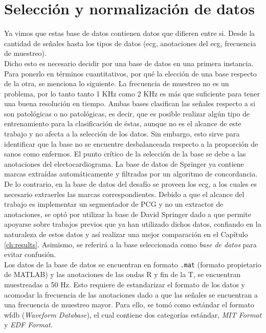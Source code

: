 \section{Selección y normalización de datos} \label{sec:data-selection-normalization}

Ya vimos que estas base de datos contienen datos que difieren entre si. Desde la cantidad de señales hasta los tipos
de datos (\acrshort{ecg}, anotaciones del \acrshort{ecg}, frecuencia de muestreo). \\
\indent Dicho esto es necesario decidir por una base de datos en una primera instancia. Para ponerlo en términos
cuantitativos, por qué la elección de una base respecto de la otra, se menciona lo siguiente. La frecuencia de
muestreo no es un problema, por lo tanto tanto 1 KHz como 2 KHz es más que suficiente para tener una buena
resolución en tiempo. Ambas bases clasifican las señales respecto a si son patológicas o no patológicas, es decir,
que es posible realizar algún tipo de entrenamiento para la clasificación de éstas, aunque no es el alcance de este
trabajo y no afecta a la selección de los datos. Sin embargo, esto sirve para identificar que la base no se
encuentre desbalanceada respecto a la proporción de sanos como enfermos. El punto crítico de la selección de la base
se debe a las anotaciones del electocardiograma. La base de datos de Springer \cite{ref:logi-regression-springer} ya
contiene marcas extraídas automáticamente y filtradas por un algoritmo de concordancia. De lo contrario, en la base
de datos del desafío se proveen los \acrshort{ecg}, a los cuales es necesario extraerles las marcas correspondientes.
Debido a que el alcance del trabajo es implementar un segmentador de PCG y no un extractor de anotaciones, se optó
por utilizar la base de David Springer dado a que permite apoyarse sobre trabajos previos que ya han utilizado
dichos datos, confiando en la naturaleza de estos datos y así realizar una mejor comparación en el Capítulo
\ref{ch:results}. Asimismo, se referirá a la base seleccionada como \textit{base de datos} para evitar confusión. \\
\indent Los datos de la base de datos se encuentran en formato \texttt{.mat} (formato propietario de
\textsc{MATLAB\texttrademark}) y las anotaciones de las ondas R y fin de la T, se encuentran muestreadas a 50 Hz.
Esto requiere de estandarizar el formato de los datos y acomodar la frecuencia de las anotaciones dado a que las
señales se encuentran a una frecuencia de muestreo mayor. Para ello, se tomó como estándar el formato
\acrshort{wfdb} (\textit{Waveform Database}), el cual contiene dos categorías estándar, \textit{MIT Format} y
\textit{EDF Format}.

